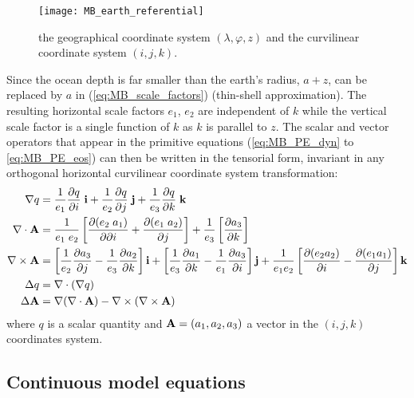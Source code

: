 \documentclass[../main/NEMO_manual]{subfiles}
\begin{document}
\begin{figure}
  \centering
  \texttt{[image: MB\_earth\_referential]}
  \caption[Geographical and curvilinear coordinate systems]{
    the geographical coordinate system $(\lambda,\varphi,z)$ and the curvilinear
    coordinate system $(i,j,k)$.}
  \label{fig:MB_referential}
\end{figure}

Since the ocean depth is far smaller than the earth's radius, $a + z$, can be replaced by $a$ in
(\autoref{eq:MB_scale_factors}) (thin-shell approximation).
The resulting horizontal scale factors $e_1$, $e_2$  are independent of $k$ while
the vertical scale factor is a single function of $k$ as $k$ is parallel to $z$.
The scalar and vector operators that appear in the primitive equations
(\autoref{eq:MB_PE_dyn} to \autoref{eq:MB_PE_eos}) can then be written in the tensorial form,
invariant in any orthogonal horizontal curvilinear coordinate system transformation:
\begin{subequations}
  \begin{align}
    \label{eq:MB_grad}
    \nabla q &=   \frac{1}{e_1} \pd[q]{i} \; \vect i + \frac{1}{e_2} \pd[q]{j} \; \vect j + \frac{1}{e_3} \pd[q]{k} \; \vect k \\
    \label{eq:MB_div}
    \nabla \cdot \vect A &=   \frac{1}{e_1 \; e_2} \lt[ \pd[(e_2 \; a_1)]{\partial i} + \pd[(e_1 \; a_2)]{j} \rt] + \frac{1}{e_3} \lt[ \pd[a_3]{k} \rt] \\
    \label{eq:MB_curl}
      \nabla \times \vect{A} &=   \lt[ \frac{1}{e_2} \pd[a_3]{j} - \frac{1}{e_3} \pd[a_2]{k}   \rt] \vect i + \lt[ \frac{1}{e_3} \pd[a_1]{k} - \frac{1}{e_1} \pd[a_3]{i}   \rt] \vect j + \frac{1}{e_1 e_2} \lt[ \pd[(e_2 a_2)]{i} - \pd[(e_1 a_1)]{j} \rt] \vect k \\
    \label{eq:MB_lap}
    \Delta q &= \nabla \cdot (\nabla q) \\
    \label{eq:MB_lap_vector}
    \Delta \vect A &= \nabla (\nabla \cdot \vect A) - \nabla \times (\nabla \times \vect A)
  \end{align}
\end{subequations}
where $q$ is a scalar quantity and
$\mathbf{A} = (a_1,a_2,a_3)$ a vector in the $(i,j,k)$ coordinates system.

\subsection{Continuous model equations}
\label{subsec:MB_zco_Eq}
\end{document}
